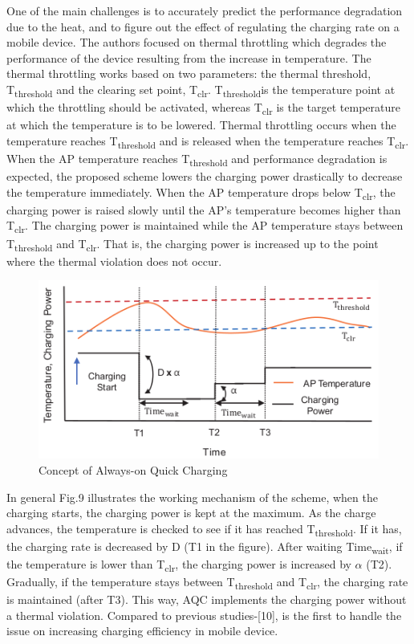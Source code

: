 \documentclass[conference]{IEEEtran}
\begin{document}
One of the main challenges is to accurately predict the performance degradation due to the heat, and to figure out the effect of regulating the charging rate on a mobile device. The authors \cite{b1} focused on thermal throttling which degrades the performance of the device resulting from the increase in temperature.
The thermal throttling works based on two parameters: the thermal threshold, T\textsubscript{threshold} and the clearing set point, T\textsubscript{clr}. T\textsubscript{threshold}is the temperature point at which the throttling should be activated, whereas T\textsubscript{clr} is the target temperature at which the temperature is to be lowered. Thermal throttling occurs when the temperature reaches T\textsubscript{threshold} and is released when the temperature reaches T\textsubscript{clr}. When the AP temperature reaches T\textsubscript{threshold} and performance degradation is expected, the proposed scheme lowers the charging power drastically to decrease the temperature immediately. When the AP temperature drops below T\textsubscript{clr}, the charging power is raised slowly until the AP’s temperature becomes higher than T\textsubscript{clr}. The charging power is maintained while the AP temperature stays between T\textsubscript{threshold} and T\textsubscript{clr}. That is, the charging power is increased up to the point where the thermal violation does not occur. \cite{b1}

\begin{figure}[h!]
  \includegraphics[width=\linewidth]{images/image9.png}
  \caption{Concept of Always-on Quick Charging\cite{b1}}
\end{figure}

In general Fig.9 illustrates the working mechanism of the scheme, when the charging starts, the charging power is kept at the maximum. As the charge advances, the temperature is checked to see if it has reached T\textsubscript{threshold}. If it has, the charging rate is decreased by D (T1 in the figure). After waiting Time\textsubscript{wait}, if the temperature is lower than  T\textsubscript{clr}, the charging power is increased by $\alpha$ (T2). Gradually, if the temperature stays between T\textsubscript{threshold} and T\textsubscript{clr}, the charging rate is maintained (after T3). This way, AQC implements the charging power without a thermal violation. Compared to previous studies\cite{b7}-[10], \cite{b1} is the first to handle the issue on increasing charging efficiency in mobile device. 
\end{document}
